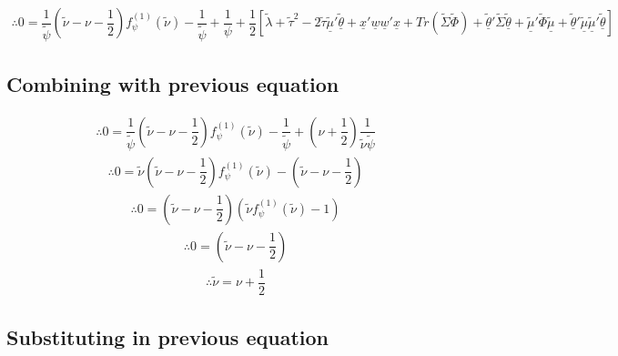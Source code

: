 \documentclass[fleqn]{minimal}
\begin{document}
\begin{align*}
  \therefore
  0 =
  \dfrac{1}{\tilde{\psi}}
  \left(
    \tilde{\nu}
    -\nu
    -\dfrac{1}{2}
  \right)
  f_{\psi}^{(1)} \left( \tilde{\nu} \right)
  -
  \dfrac{1}{\tilde{\psi}}
  +
  \dfrac{1}{\psi}
  + \dfrac{1}{2}
  \left[
    \tilde{\lambda} + \tilde{\tau}^2
    - 2\tilde{\tau}\underline{\tilde{\mu}}'\underline{\tilde{\theta}}
    + \underline{x}'\underline{w}\underline{w}'\underline{x}
    + Tr \left( \tilde{\Sigma}\tilde{\Phi}\right)
    + \underline{\tilde{\theta}}'\tilde{\Sigma}\underline{\tilde{\theta}}
    + \underline{\tilde{\mu}}'\tilde{\Phi}\underline{\tilde{\mu}}
    + \underline{\tilde{\theta}}'\underline{\tilde{\mu}}\underline{\tilde{\mu}}'\underline{\tilde{\theta}}
  \right]
\end{align*}

\subsection{Combining with previous equation}

\begin{align*}
  \therefore
  0 =
  \dfrac{1}{\tilde{\psi}}
  \left(
    \tilde{\nu}
    -\nu
    -\dfrac{1}{2}
  \right)
  f_{\psi}^{(1)} \left( \tilde{\nu} \right)
  -
  \dfrac{1}{\tilde{\psi}}
  +
  \left(
    \nu
    +\dfrac{1}{2}
  \right)
  \dfrac{1}{\tilde{\nu}\tilde{\psi}}
\end{align*}
\begin{align*}
  \therefore
  0 =
  \tilde{\nu}
  \left(
    \tilde{\nu}
    -\nu
    -\dfrac{1}{2}
  \right)
  f_{\psi}^{(1)} \left( \tilde{\nu} \right)
  -
  \left(
    \tilde{\nu}
    - \nu
    - \dfrac{1}{2}
  \right)
\end{align*}
\begin{align*}
  \therefore
  0 =
  \left(
    \tilde{\nu}
    -\nu
    -\dfrac{1}{2}
  \right)
  \left(
    \tilde{\nu}
    f_{\psi}^{(1)} \left( \tilde{\nu} \right)
    -
    1
  \right)
\end{align*}
\begin{align*}
  \therefore
  0 =
  \left(
    \tilde{\nu}
    -\nu
    -\dfrac{1}{2}
  \right)
\end{align*}
\begin{align*}
  \therefore
  \tilde{\nu}
  =
  \nu
  +\dfrac{1}{2}
\end{align*}

\subsection{Substituting in previous equation}
\end{document}
